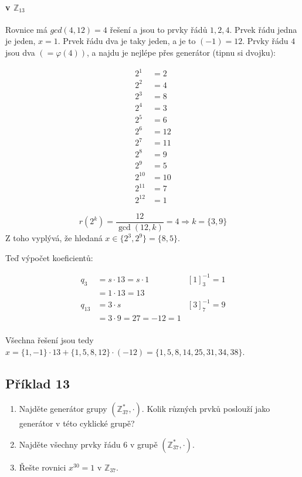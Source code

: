 \documentclass{article}
\begin{document}
\paragraph{v $\mathbb{Z}_{13}$}
Rovnice má $gcd(4,12) = 4$ řešení a jsou to prvky řádů ${1,2,4}$. Prvek řádu jedna je jeden, $x = 1$. Prvek řádu dva je taky jeden, a je to $(-1) = 12$. Prvky řádu $4$ jsou dva $(=\varphi(4))$, a najdu je nejlépe přes generátor (tipnu si dvojku):

\begin{align*}
2^1 &= 2\\
2^2	&= 4\\ 
2^3	&= 8\\
2^4	&= 3\\
2^5	&= 6\\
2^6	&= 12\\
2^7	&= 11\\
2^8	&= 9\\
2^9	&= 5\\
2^{10} &= 10\\
2^{11} &=	7\\
2^{12} &=	1
\end{align*}

\[ r(2^k) = \frac{12}{\gcd(12,k)} = 4 \Rightarrow k = \{3,9\} \]
Z toho vyplývá, že hledaná \(x \in \{2^3, 2^9\} = \{8, 5\}\).

Teď výpočet koeficientů:
 
\begin{align*}
q_3 & = s\cdot 13 = s\cdot 1 & \left[ 1\right]^{-1}_3 = 1\\
		& = 1 \cdot 13 = 13 \\
q_{13} & = 3 \cdot s & \left[ 3\right]^{-1}_{7} = 9\\
		& = 3 \cdot 9 = 27 = -12 = 1 \\
\end{align*}

Všechna řešení jsou tedy $x = \{1,-1\}\cdot 13 + \{1,5,8,12\}\cdot(-12) = \{1,5,8,14,25,31,34,38\}$.

\subsection{Příklad 13}
\begin{enumerate}
	\item Najděte generátor grupy $(\mathbb{Z}_{37}^*, \cdot)$. Kolik různých prvků poslouží jako generátor v této cyklické grupě?
	\item Najděte všechny prvky řádu $6$ v grupě $(\mathbb{Z}_{37}^*, \cdot)$.
	\item Řešte rovnici $x^{30} = 1$ v $\mathbb{Z}_{37}$.
\end{enumerate}
\end{document}
